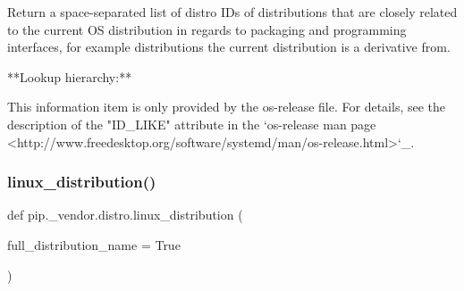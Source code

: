 \begin{DoxyVerb}Return a space-separated list of distro IDs of distributions that are
closely related to the current OS distribution in regards to packaging
and programming interfaces, for example distributions the current
distribution is a derivative from.

**Lookup hierarchy:**

This information item is only provided by the os-release file.
For details, see the description of the "ID_LIKE" attribute in the
`os-release man page
<http://www.freedesktop.org/software/systemd/man/os-release.html>`_.
\end{DoxyVerb}
 \mbox{\label{namespacepip_1_1__vendor_1_1distro_a865830705e3dca30a022cfa469606cca}} 
\subsubsection{\texorpdfstring{linux\+\_\+distribution()}{linux\_distribution()}}
{\footnotesize\ttfamily def pip.\+\_\+vendor.\+distro.\+linux\+\_\+distribution (\begin{DoxyParamCaption}\item[{}]{full\+\_\+distribution\+\_\+name = {\ttfamily True} }\end{DoxyParamCaption})}


